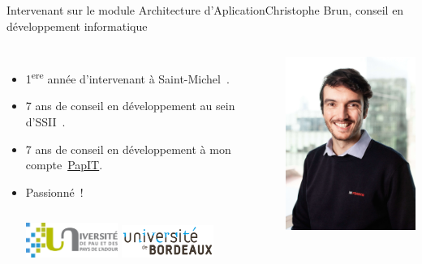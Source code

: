 \documentclass{beamer}
\begin{document}
    \begin{frame}{Intervenant sur le module Architecture d'Aplication}{Christophe Brun, conseil en développement informatique}

        \begin{columns}
            \begin{itemize}
                \item 1\textsuperscript{ere} année d'intervenant à Saint-Michel~.

                \item 7 ans de conseil en développement au sein d'SSII~.

                \item 7 ans de conseil en développement à mon compte~\href{https://papit.fr}{PapIT}.

                \item Passionné~!
                \bigbreak
                \begin{columns}
                    \centering
                    \includegraphics[width=3cm]{image/logo-uppa}
                    \centering
                    \includegraphics[width=3cm]{image/logo-universite-bordeaux}
                \end{columns}
            \end{itemize}
            \centering
            \includegraphics[width=5cm]{image/trombine-christophe}
        \end{columns}
    \end{frame}
\end{document}
